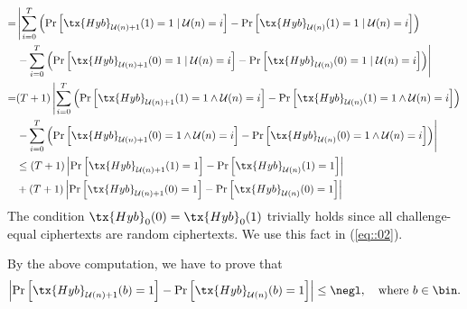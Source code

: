 \documentclass{fundam}
\begin{document}
\begin{align}
	=&\left|  \sum_{i=0}^{T}  \left(  \Pr\left[   \tx{Hyb}_{\mathcal{U}(n)+1}(1)=1 \mid \mathcal{U}(n) = i \right]   -   \Pr\left[   \tx{Hyb}_{\mathcal{U}(n)}(1)=1 \mid \mathcal{U}(n) = i \right] \right) \right. \nonumber \\
	&\left. - \sum_{i=0}^{T}  \left(  \Pr\left[   \tx{Hyb}_{\mathcal{U}(n)+1}(0)=1 \mid \mathcal{U}(n) = i \right]   -   \Pr\left[   \tx{Hyb}_{\mathcal{U}(n)}(0)=1 \mid \mathcal{U}(n) = i \right] \right) \right| \label{eq::02} \\
	= & (T+1)\left|  \sum_{i=0}^{T}  \left(  \Pr\left[   \tx{Hyb}_{\mathcal{U}(n)+1}(1)=1 \land \mathcal{U}(n) = i \right]   -   \Pr\left[   \tx{Hyb}_{\mathcal{U}(n)}(1)=1 \land \mathcal{U}(n) = i \right] \right) \right. \nonumber\\ %
	&\left. - \sum_{i=0}^{T}  \left(  \Pr\left[   \tx{Hyb}_{\mathcal{U}(n)+1}(0)=1 \land \mathcal{U}(n) = i \right]   -   \Pr\left[   \tx{Hyb}_{\mathcal{U}(n)}(0)=1 \land \mathcal{U}(n) = i \right] \right) \right| \nonumber \\
	&\leq (T+1) \left|  \Pr\left[   \tx{Hyb}_{\mathcal{U}(n)+1}(1)=1\right] - \Pr\left[   \tx{Hyb}_{\mathcal{U}(n)}(1)=1  \right]  \right|  \nonumber \\
	&+  (T+1) \left|  \Pr\left[   \tx{Hyb}_{\mathcal{U}(n)+1}(0)=1\right] - \Pr\left[   \tx{Hyb}_{\mathcal{U}(n)}(0)=1  \right]  \right| \nonumber
\end{align}	
The condition $\tx{Hyb}_{0}(0)  =  \tx{Hyb}_{0}(1)$ trivially holds since all challenge-equal ciphertexts are random ciphertexts. We use this fact in (\ref{eq::02}). 

By the above computation, we have to prove that 
\begin{align*}
	\left|  \Pr\left[   \tx{Hyb}_{\mathcal{U}(n)+1}(b)=1\right] - \Pr\left[   \tx{Hyb}_{\mathcal{U}(n)}(b)=1  \right]  \right| \leq \negl, ~~~\text{where}~b\in\bin.
\end{align*} 
\end{document}
